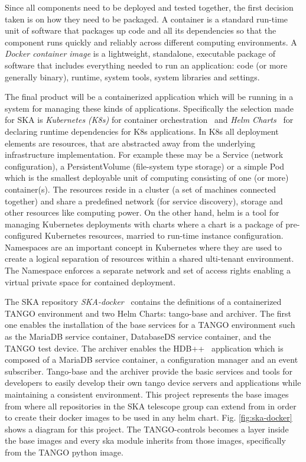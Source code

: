 \documentclass[a4paper]{spie}  %
\begin{document}
Since all components need to be deployed and tested together, the first decision taken is on how they need to be packaged.  A container is a standard run-time unit of software that packages up code and all its dependencies so that the component runs quickly and reliably across different computing environments. A \textit{Docker container image} is a lightweight, standalone, executable package of software that includes everything needed to run an application: code (or more generally binary), runtime, system tools, system libraries and settings.

The final product will be a containerized application which will be running in a system for managing these kinds of applications. Specifically the selection made for SKA is \textit{Kubernetes (K8s)} for container orchestration~\cite{kubernetes} and \textit{Helm Charts}~\cite{helm} for declaring runtime dependencies for K8s applications. In K8s all deployment elements are resources, that are abstracted away from the underlying infrastructure implementation.  For example these may be a Service (network configuration), a PersistentVolume (file-system type storage) or a simple Pod which is the smallest deployable unit of computing consisting of one (or more) container(s). The resources reside in a cluster (a set of machines connected together) and share a predefined network (for service discovery), storage and other resources like computing power. On the other hand, helm is a tool for managing Kubernetes deployments with charts where a chart is a package of pre-configured Kubernetes resources, married to run-time instance configuration.  Namespaces are an important concept in Kubernetes where they are used to create a logical separation of resources within a shared ulti-tenant environment.  The Namespace enforces a separate network and set of access rights enabling a virtual private space for contained deployment.

The SKA repository \textit{SKA-docker}~\cite{SKA-docker} contains the definitions of a containerized TANGO environment and two Helm Charts: tango-base and archiver. The first one enables the installation of the base services for a TANGO environment such as the MariaDB service container, DatabaseDS service container, and the TANGO test device. The archiver enables the HDB++~\cite{hdb} application which is composed of a MariaDB service container, a configuration manager and an event subscriber. Tango-base and the archiver provide the basic services and tools for developers to easily develop their own tango device servers and applications while maintaining a consistent environment. This project represents the base images from where all repositories in the SKA telescope group can extend from in order to create their docker images to be used in any helm chart. Fig. \ref{fig:ska-docker} shows a diagram for this project. The TANGO-controls becomes a layer inside the base images and every ska module inherits from those images, specifically from the TANGO python image.
\end{document}
